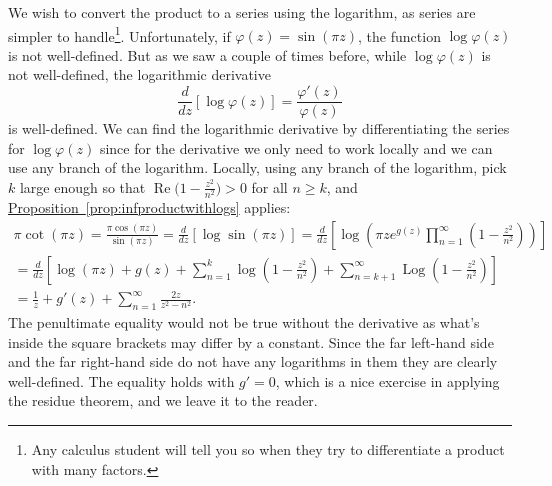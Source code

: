 \documentclass[12pt,openany]{book}
\renewcommand{\Re}{\operatorname{Re}}
\newcommand{\Log}{\operatorname{Log}}
\theoremstyle{plain}
\theoremstyle{remark}
\theoremstyle{definition}
\theoremstyle{exercise}
\theoremstyle{example}
\newcommand{\propref}[1]{\hyperref[#1]{Proposition~\ref*{#1}}}
\begin{document}
We wish to convert the product to a series using the
logarithm, as series are simpler to handle\footnote{Any calculus student
will tell you so when they try to differentiate a product with many
factors.}.  Unfortunately, if $\varphi(z) =
\sin(\pi z)$, the function
$\log \varphi(z)$ is not well-defined.
But as we saw a couple of times before, while $\log \varphi(z)$ is not
well-defined, the logarithmic derivative
\begin{equation*}
\frac{d}{dz} \left[
\log \varphi(z)
\right]
=
\frac{\varphi'(z)}{\varphi(z)}
\end{equation*}
is well-defined.  We can find the logarithmic derivative by differentiating
the series for $\log \varphi(z)$
since for the derivative we only need to work locally and we can use
any branch of the logarithm.
Locally, using any branch of the logarithm,
pick $k$ large enough so that $\Re \bigl( 1-\frac{z^2}{n^2} \bigr) > 0$
for all $n \geq k$, and
\propref{prop:infproductwithlogs} applies:
\begin{multline*}
\pi \cot (\pi z) =
\frac{\pi \cos (\pi z)}{\sin(\pi z)}
=
\frac{d}{dz} \left[
\log \sin (\pi z)
\right]
=
\frac{d}{dz} \left[
\log 
\left(
\pi z
e^{g(z)}
\prod_{n=1}^\infty 
\left(1-\frac{z^2}{n^2}\right)
\right)
\right]
\\
=
\frac{d}{dz} \left[
\log(\pi z)
+
g(z)
+
\sum_{n=1}^k 
\log
\left(1-\frac{z^2}{n^2}\right)
+
\sum_{n=k+1}^\infty
\Log
\left(1-\frac{z^2}{n^2}\right)
\right]
\\
=
\frac{1}{z}
+
g'(z)
+
\sum_{n=1}^\infty 
\frac{2z}{z^2-n^2} .
\end{multline*}
The penultimate equality would not be true without the derivative as what's
inside the square brackets may differ by a constant.
Since the far left-hand side and the far right-hand side do not have any
logarithms in them they are clearly well-defined.
The equality holds with $g'=0$, which is 
a nice exercise in applying the residue theorem, and we
leave it to the reader.
\end{document}
